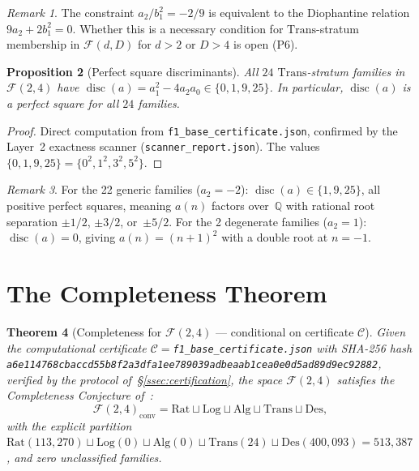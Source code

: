 \documentclass[12pt, reqno]{amsart}
\newtheorem{theorem}{Theorem}[section]
\newtheorem{proposition}[theorem]{Proposition}
\theoremstyle{definition}
\theoremstyle{remark}
\newtheorem{remark}[theorem]{Remark}
\newcommand{\Rat}{\mathrm{Rat}}
\newcommand{\Log}{\mathrm{Log}}
\newcommand{\Alg}{\mathrm{Alg}}
\newcommand{\Trans}{\mathrm{Trans}}
\newcommand{\Des}{\mathrm{Des}}
\DeclareMathOperator{\disc}{disc}
\begin{document}
\begin{remark}\label{rem:diophantine}
The constraint $a_2/b_1^2 = -2/9$ is equivalent
to the Diophantine relation $9a_2 + 2b_1^2 = 0$. Whether this
is a necessary condition for $\Trans$-stratum membership in
$\mathcal{F}(d,D)$ for $d > 2$ or $D > 4$ is open (P6).
\end{remark}

\begin{proposition}[Perfect square discriminants]\label{prop:disc}
All $24$ $\Trans$-stratum families in $\mathcal{F}(2,4)$ have
$\disc(a) = a_1^2 - 4a_2 a_0 \in \{0, 1, 9, 25\}$.
In particular, $\disc(a)$ is a perfect square for all
$24$ families.
\end{proposition}

\begin{proof}
Direct computation from \texttt{f1\_base\_certificate.json},
confirmed by the Layer~2 exactness scanner (\texttt{scanner\_report.json}).
The values $\{0, 1, 9, 25\} = \{0^2, 1^2, 3^2, 5^2\}$.
\end{proof}

\begin{remark}\label{rem:rootsep}
For the 22 generic families ($a_2 = -2$):
$\disc(a) \in \{1, 9, 25\}$, all positive perfect squares,
meaning $a(n)$ factors over~$\mathbb{Q}$ with rational root separation
$\pm 1/2$, $\pm 3/2$, or~$\pm 5/2$. For the 2 degenerate families
($a_2 = 1$): $\disc(a) = 0$, giving $a(n) = (n+1)^2$ with a
double root at $n = -1$.
\end{remark}


\section{The Completeness Theorem}\label{sec:completeness}

\begin{theorem}[Completeness for $\mathcal{F}(2,4)$ --- conditional on certificate $\mathcal{C}$]\label{thm:completeness}
Given the computational certificate
$\mathcal{C} = {}$\texttt{f1\_base\_certificate.json}
with SHA-256 hash
\texttt{a6e114768cbaccd55b8f2a3dfa1ee789039adbeaab1cea0e0d5ad89d9ec92882},
verified by the protocol of~\S\ref{ssec:certification},
the space $\mathcal{F}(2,4)$ satisfies the
Completeness Conjecture of~\cite{logladder}:
\[
  \mathcal{F}(2,4)_{\mathrm{conv}} = \Rat \sqcup \Log \sqcup \Alg \sqcup \Trans \sqcup \Des,
\]
with the explicit partition $\Rat(113{,}270) \sqcup \Log(0) \sqcup \Alg(0) \sqcup \Trans(24) \sqcup \Des(400{,}093) = 513{,}387$,
and zero unclassified families.
\end{theorem}
\end{document}
